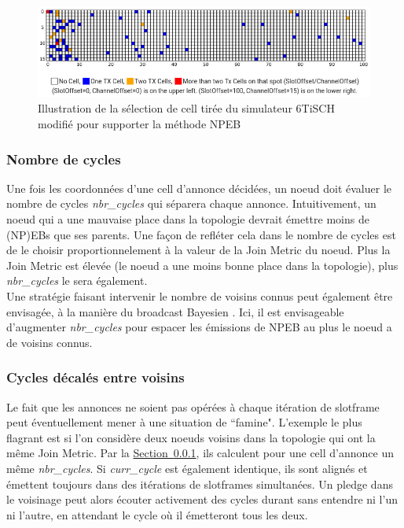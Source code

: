 \documentclass[]{report}
\newcommand{\wordlink}[2]{\hyperref[#2]{#1~\ref{#2}}}
\begin{document}
\newpage

 \vspace{1cm}
	\begin{figure}[!h]
	\centering
	\includegraphics[width=0.95\linewidth]{NPEB_cell}
	\caption{Illustration de la sélection de cell tirée du simulateur 6TiSCH \cite{simulating-6TiSCH} modifié pour supporter la méthode NPEB}
	\label{fig:NPEB_cells}
	\end{figure}

\vspace{0.6cm}

\subsubsection{Nombre de cycles}
\label{NPEBopti_nbr_cycles}

Une fois les coordonnées d'une cell d'annonce décidées, un noeud doit évaluer le nombre de cycles \textit{nbr\_cycles} qui séparera chaque annonce. Intuitivement, un noeud qui a une mauvaise place dans la topologie devrait émettre moins de (NP)EBs que ses parents. Une façon de refléter cela dans le nombre de cycles est de le choisir proportionnelement à la valeur de la Join Metric du noeud. Plus la Join Metric est élevée (le noeud a une moins bonne place dans la topologie), plus \textit{nbr\_cycles} le sera également.\\

Une stratégie faisant intervenir le nombre de voisins connus peut également être envisagée, à la manière du broadcast Bayesien \cite{broadcast-strategies}. Ici, il est envisageable d'augmenter \textit{nbr\_cycles} pour espacer les émissions de NPEB au plus le noeud a de voisins connus.
~\\
\subsubsection{Cycles décalés entre voisins}

Le fait que les annonces ne soient pas opérées à chaque itération de slotframe peut éventuellement mener à une situation de ``famine". L'exemple le plus flagrant est si l'on considère deux noeuds voisins dans la topologie qui ont la même Join Metric. Par la \wordlink{Section}{NPEBopti_nbr_cycles}, ils calculent pour une cell d'annonce un même \textit{nbr\_cycles}. Si \textit{curr\_cycle} est également identique, ils sont alignés et émettent toujours dans des itérations de slotframes simultanées. Un pledge dans le voisinage peut alors écouter activement des cycles durant sans entendre ni l'un ni l'autre, en attendant le cycle où il émetteront tous les deux.\\
\end{document}
